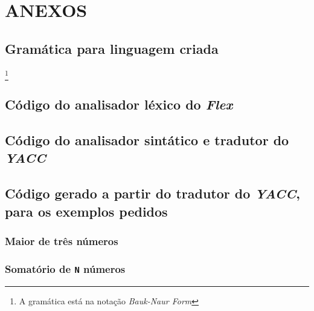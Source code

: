 \appendix

\part*{ANEXOS}

\chapter{Gramática para linguagem criada}\footnote{A gramática está na notação
	\emph{Bauk-Naur Form}}
\label{appendix:a}

\chapter{Código do analisador léxico do \emph{Flex}}
\label{appendix:b}

\chapter{Código do analisador sintático e tradutor do \emph{YACC}}
\label{appendix:c}

\chapter{Código gerado a partir do tradutor do \emph{YACC}, para os exemplos
pedidos}
\label{appendix:d}
\section{Maior de três números}
\label{appendix:d:sec:d1}


\section{Somatório de \texttt{N} números}
\label{appendix:d:sec:d2}


